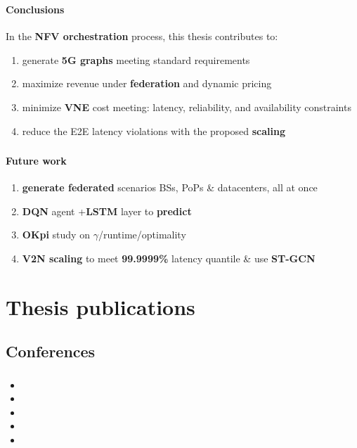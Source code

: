 \documentclass[aspectratio=169]{beamer}
\begin{document}
\begin{frame}
    \frametitle{\secname}
    \framesubtitle{Conclusions}
    In the \textbf{NFV orchestration} process, this thesis contributes to:\pause
    \begin{enumerate}
        \item generate \textbf{5G graphs} meeting standard requirements\pause
        \item maximize revenue under \textbf{federation} and dynamic pricing\pause
        \item minimize \textbf{VNE} cost meeting: latency, reliability, and availability constraints\pause
        \item reduce the E2E latency violations with the proposed \textbf{scaling}
    \end{enumerate}
\end{frame}






\begin{frame}
    \frametitle{\secname}
    \framesubtitle{Future work}
    \begin{enumerate}
        \item \textbf{generate federated} scenarios BSs, PoPs \& datacenters, all at once\pause
        \item \textbf{DQN} agent +\textbf{LSTM} layer to \textbf{predict}\pause
        \item \textbf{OKpi} study on $\gamma$/runtime/optimality \pause
        \item \textbf{V2N scaling} to meet \textbf{99.9999\%} latency quantile \& use \textbf{ST-GCN}
    \end{enumerate}
\end{frame}



\section*{Thesis publications}
\subsection*{Conferences}
\begin{frame}[allowframebreaks]
    \frametitle{\secname}
    \framesubtitle{\subsecname}

    \begin{itemize}
        \item {}
        \item {}
        \item {}
        \item {}
        \item {}
    \end{itemize}
\end{frame}
\end{document}
